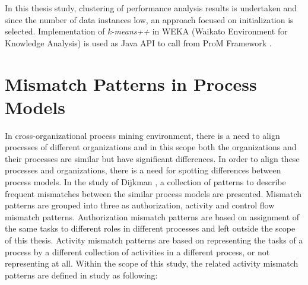 In this thesis study, clustering of performance analysis results is undertaken and since the number of data instances low, an approach focused on initialization is selected. Implementation of \textit{k-means++} in WEKA (Waikato Environment for Knowledge Analysis) \cite{hall2009} is used as Java API to call from ProM Framework \cite{verbeek2010prom}. 

\section{Mismatch Patterns in Process Models}
\label{sec:mismatch-patterns-in-process-models}

In cross-organizational process mining environment, there is a need to align processes of different organizations and in this scope both the organizations and their processes are similar but have significant differences. In order to align these processes and organizations, there is a need for spotting differences between process models. In the study of Dijkman \cite{dijkman2007mismatch}, a collection of patterns to describe frequent mismatches between the similar process models are presented. Mismatch patterns are grouped into three as authorization, activity and control flow mismatch patterns. Authorization mismatch patterns are based on assignment of the same tasks to different roles in different processes and left outside the scope of this thesis. Activity mismatch patterns are based on representing the tasks of a process by a different collection of activities in a different process, or not representing at all. Within the scope of this study, the related activity mismatch patterns are defined in study \cite{dijkman2007mismatch} as following:
